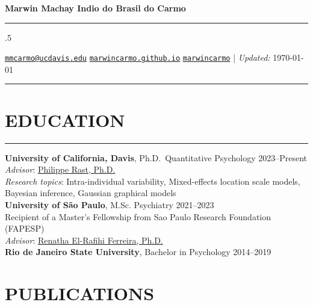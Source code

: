 \documentclass[10pt,]{article}
\begin{document}
\centerline{\huge \bf Marwin Machay Indio do Brasil do Carmo}

\vspace{2 mm}

\hrule

\vspace{2 mm}



\moveleft.5\hoffset\centerline{ \faEnvelopeO \hspace{1 mm} \href{mailto:}{\tt \href{mailto:mmcarmo@ucdavis.edu}{\nolinkurl{mmcarmo@ucdavis.edu}}} \hspace{1 mm}  \faGlobe \hspace{1 mm} \href{http://marwincarmo.github.io}{\tt marwincarmo.github.io} \hspace{1 mm}   \faGithub \hspace{1 mm} \href{http://github.com/marwincarmo}{\tt marwincarmo}   | \emph{Updated:} \today} 

\vspace{2 mm}

\hrule


\section{EDUCATION}\label{education}

\hrule

\textbf{University of California, Davis}, Ph.D.~Quantitative Psychology
\hfill 2023--Present\\
\emph{Advisor}: \href{https://rastlab.ucdavis.edu/}{Philippe Rast,
Ph.D.}\\
\emph{Research topics}: Intra-individual variability, Mixed-effects
location scale models, Bayesian inference, Gaussian graphical models\\
\textbf{University of São Paulo}, M.Sc. Psychiatry \hfill 2021--2023\\
Recipient of a Master's Fellowship from Sao Paulo Research Foundation
(FAPESP)\\
\emph{Advisor}:
\href{https://scholar.google.com.br/citations?hl=pt-BR&user=sLWIwcoAAAAJ}{Renatha
El-Rafihi Ferreira, Ph.D.}\\
\textbf{Rio de Janeiro State University}, Bachelor in Psychology
\hfill 2014--2019

\section{PUBLICATIONS}\label{publications}
\end{document}
